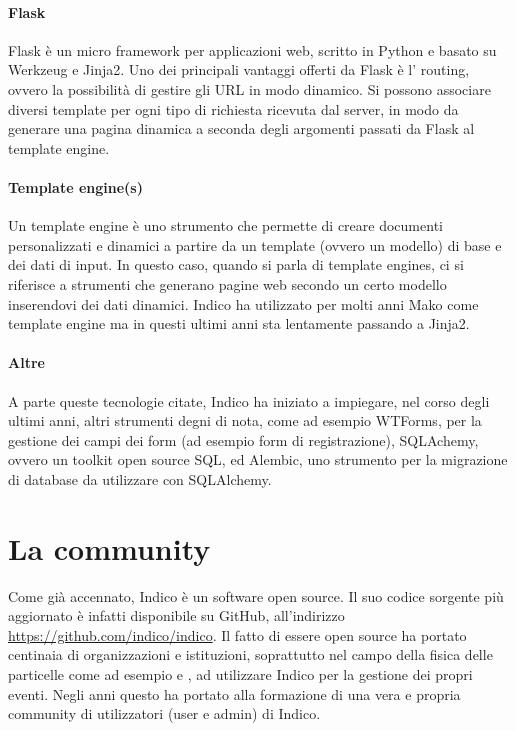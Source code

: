 		\paragraph{Flask}Flask è un micro framework per applicazioni web, scritto in Python e basato su Werkzeug e Jinja2. Uno dei principali vantaggi offerti da Flask è l' routing, ovvero la  possibilità di gestire gli \ac{URL} in modo dinamico. Si possono associare diversi template per ogni tipo di richiesta ricevuta dal server, in modo da generare una pagina dinamica a seconda degli argomenti passati da Flask al template engine. \cite{indico:flask}
		
		\paragraph{Template engine(s)}Un template engine è uno strumento che permette di creare documenti personalizzati e dinamici a partire da un template (ovvero un modello) di base e dei dati di input. In questo caso, quando si parla di template engines, ci si riferisce a strumenti che generano pagine web secondo un certo modello inserendovi dei dati dinamici. Indico ha utilizzato per molti anni Mako come template engine ma in questi ultimi anni sta lentamente passando a Jinja2. \cite{indico:template_engines}
		
		\paragraph{Altre}A parte queste tecnologie citate, Indico ha iniziato a impiegare, nel corso degli ultimi anni, altri strumenti degni di nota, come  ad esempio WTForms, per la gestione dei campi dei form (ad esempio form di registrazione), SQLAchemy, ovvero un toolkit open source SQL, ed Alembic, uno strumento per la migrazione di database da utilizzare con SQLAlchemy.
		
	\section{La community} \label{sec:i;community}
	
		Come già accennato,  Indico è un software open source. Il suo codice sorgente più aggiornato è infatti disponibile su GitHub, all'indirizzo \url{https://github.com/indico/indico}. Il fatto di essere open source ha portato centinaia di organizzazioni e istituzioni, soprattutto nel campo della fisica delle particelle come ad esempio  e , ad utilizzare Indico per la gestione dei propri eventi. Negli anni questo ha portato alla formazione di una vera e propria community di utilizzatori (user e admin) di Indico.
		
